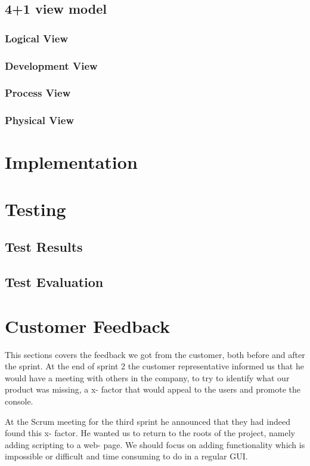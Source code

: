 \subsection{4+1 view model}
\subsubsection{Logical View}
\subsubsection{Development View}
\subsubsection{Process View}
\subsubsection{Physical View}

\section{Implementation}

\section{Testing}
\subsection{Test Results}
\subsection{Test Evaluation}

\section{Customer Feedback}
This sections covers the feedback we got from the customer, both before and after the sprint.
\newline
\newline
At the end of sprint 2 the customer representative informed us that he would have a meeting with others in the company, to try to identify what our product was missing, a x- factor that would appeal to the users and promote the console.

At the Scrum meeting for the third sprint he announced that they had indeed found this x- factor. He wanted us to return to the roots of the project, namely adding scripting to a web- page. We should focus on adding functionality which is impossible or difficult and time consuming to do in a regular GUI.

